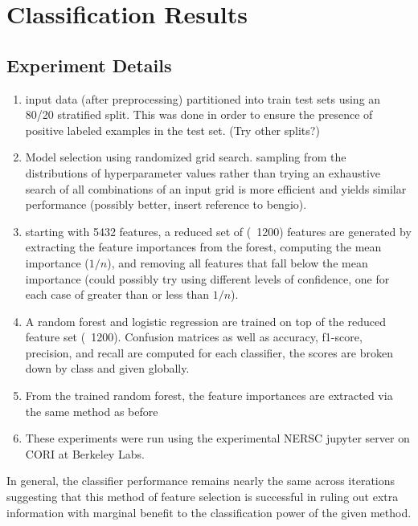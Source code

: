 \documentclass{article}
\begin{document}

\section{Classification Results}
\subsection{Experiment Details}
\begin{enumerate}
	\item input data (after preprocessing) partitioned into train test sets using an 80/20 stratified split. This was done in order to ensure the presence of positive labeled examples in the test set. (Try other splits?)
	\item  Model selection using randomized grid search. sampling from the distributions of hyperparameter values rather than trying an exhaustive search of all combinations of an input grid is more efficient and yields similar performance (possibly better, insert reference to bengio). 
	\item starting with 5432 features, a reduced set of (~1200) features are generated by extracting the feature importances from the forest, computing the mean importance ($1/n$), and removing all features that fall below the mean importance (could possibly try using different levels of confidence, one for each case of greater than or less than $1/n$).
	\item A random forest and logistic regression are trained on top of the reduced feature set (~1200). Confusion matrices as well as accuracy, f1-score, precision, and recall are computed for each classifier, the scores are broken down by class and given globally. 
	\item From the trained random forest, the feature importances are extracted via the same method as before
	\item These experiments were run using the experimental NERSC jupyter server on CORI at Berkeley Labs.
\end{enumerate}
In general, the classifier performance remains nearly the same across iterations suggesting that this method of feature selection is successful in ruling out extra information with marginal benefit to the classification power of the given method. 
\end{document}

